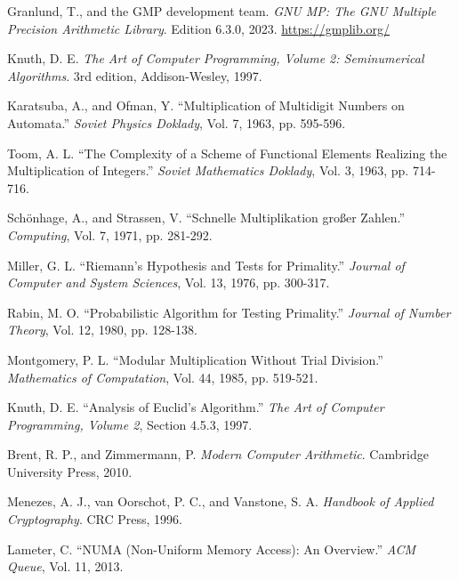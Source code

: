 \documentclass{article}
\begin{document}
\begin{thebibliography}{99}

    Granlund, T., and the GMP development team.
    \textit{GNU MP: The GNU Multiple Precision Arithmetic Library}.
    Edition 6.3.0, 2023.
    \url{https://gmplib.org/}

    Knuth, D. E.
    \textit{The Art of Computer Programming, Volume 2: Seminumerical Algorithms}.
    3rd edition, Addison-Wesley, 1997.

    Karatsuba, A., and Ofman, Y.
    ``Multiplication of Multidigit Numbers on Automata.''
    \textit{Soviet Physics Doklady}, Vol. 7, 1963, pp. 595-596.

    Toom, A. L.
    ``The Complexity of a Scheme of Functional Elements Realizing the Multiplication of Integers.''
    \textit{Soviet Mathematics Doklady}, Vol. 3, 1963, pp. 714-716.

    Schönhage, A., and Strassen, V.
    ``Schnelle Multiplikation großer Zahlen.''
    \textit{Computing}, Vol. 7, 1971, pp. 281-292.

    Miller, G. L.
    ``Riemann's Hypothesis and Tests for Primality.''
    \textit{Journal of Computer and System Sciences}, Vol. 13, 1976, pp. 300-317.

    Rabin, M. O.
    ``Probabilistic Algorithm for Testing Primality.''
    \textit{Journal of Number Theory}, Vol. 12, 1980, pp. 128-138.

    Montgomery, P. L.
    ``Modular Multiplication Without Trial Division.''
    \textit{Mathematics of Computation}, Vol. 44, 1985, pp. 519-521.

    Knuth, D. E.
    ``Analysis of Euclid's Algorithm.''
    \textit{The Art of Computer Programming, Volume 2}, Section 4.5.3, 1997.

    Brent, R. P., and Zimmermann, P.
    \textit{Modern Computer Arithmetic}.
    Cambridge University Press, 2010.

    Menezes, A. J., van Oorschot, P. C., and Vanstone, S. A.
    \textit{Handbook of Applied Cryptography}.
    CRC Press, 1996.

    Lameter, C.
    ``NUMA (Non-Uniform Memory Access): An Overview.''
    \textit{ACM Queue}, Vol. 11, 2013.

\end{thebibliography}
\end{document}
